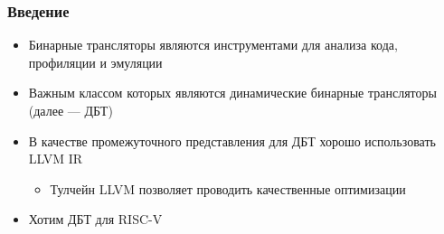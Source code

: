 \documentclass{beamer}
\begin{document}
\begin{frame}[fragile]
  \frametitle{Введение}
  \begin{itemize}
    \item Бинарные трансляторы являются инструментами для анализа кода, профиляции и эмуляции
    \item Важным классом которых являются динамические бинарные трансляторы (далее --- ДБТ)
    \item В качестве промежуточного представления для ДБТ хорошо использовать LLVM IR
          \begin{itemize}
            \item Тулчейн LLVM позволяет проводить качественные оптимизации
          \end{itemize}
    \item Хотим ДБТ для RISC-V
  \end{itemize}
\end{frame}


\end{document}
